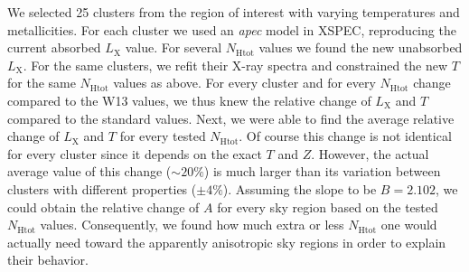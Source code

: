 \documentclass{aa}   %
\begin{document}
We selected 25 clusters from the region of interest with varying temperatures and metallicities. For each cluster we used an \textit{apec} model in XSPEC, reproducing the current absorbed $L_{\text{X}}$ value. For several $N_{\text{Htot}}$ values we found the new unabsorbed $L_{\text{X}}$. For the same clusters, we refit their X-ray spectra and constrained the new $T$ for the same $N_{\text{Htot}}$ values as above. For every cluster and for every $N_{\text{Htot}}$ change compared to the W13 values, we thus knew the relative change of $L_{\text{X}}$ and $T$ compared to the standard values. Next, we were able to find the average relative change of $L_{\text{X}}$ and $T$ for every tested $N_{\text{Htot}}$. Of course this change is not identical for every cluster since it depends on the exact $T$ and $Z$. However, the actual average value of this change ($\sim 20\%$) is much larger than its variation between clusters with different properties ($\pm 4\%$). Assuming the slope to be $B=2.102$, we could obtain the relative change of $A$ for every sky region based on the tested $N_{\text{Htot}}$ values. Consequently, we found how much extra or less $N_{\text{Htot}}$ one would actually need toward the apparently anisotropic sky regions in order to explain their behavior.


\end{document}
